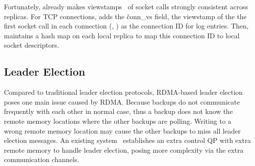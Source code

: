 Fortunately, \paxos already makes viewstamps~\cite{paxos:practical} of 
socket calls strongly consistent across replicas. For TCP connections, \xxx 
adds the \v{conn\_vs} field, the viewstamp of the the first socket call in 
each connection (\ie, \accept) as the connection ID for log entries. Then, \xxx 
maintains a hash map on each local replica to map this connection ID to local 
socket descriptors.







\subsection{Leader Election} \label{sec:election}


Compared to traditional \paxos leader election protocols, RDMA-based 
leader election poses one main issue caused by RDMA. Because backups do not 
communicate frequently with each other in normal case, thus a backup does not 
know the remote memory locations where the other backups are polling. Writing to 
a wrong remote memory location may cause the other backups to miss all leader 
election messages. An existing system~\cite{dare:hpdc15} establishes an extra 
control QP with extra remote memory to handle leader election, posing more
complexity via the extra communication channels.

